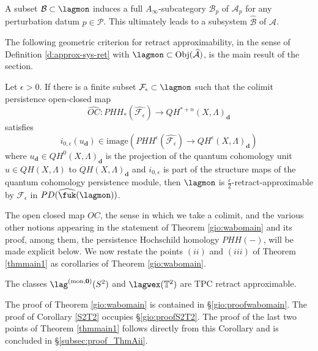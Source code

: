 A subset $\mathcal{B}\subset \lagmon$ induces a full $A_\infty$-subcategory $\mathcal{B}_p$ of $\mathcal{A}_p$ for any perturbation datum $p\in \mathcal{P}$. This  ultimately leads to a subsystem $\widehat{\mathcal{B}}$ of $\widehat{\mathcal{A}}$. %

The following geometric criterion for retract approximability,
in the sense of Definition \ref{d:approx-sys-ret} with $\lagmon \subset \text{Obj}(\widehat{\mathcal{A}})$, is the main result 
of the section.

\begin{thm}\label{gio:wabomain}
	Let $\epsilon>0$. If there is a finite subset $\mathcal{F}_\epsilon\subset\lagmon$ such that the colimit persistence open-closed map $$\widehat{OC}\colon PHH_*(\widehat{\mathcal{F}_\epsilon})\to QH^{*+n}(X,\Lambda)_{\mathbf{d}}$$ satisfies $$i_{0,\epsilon}(u_{\mathbf{d}})\in \text{image}\left(PHH^\epsilon(\widehat{\mathcal{F}_\epsilon})\to QH^\epsilon(X,\Lambda)_{\mathbf{d}}\right)$$ where $u_\mathbf{d}\in QH^0(X,\Lambda)_\mathbf{d}$ is the projection of the quantum cohomology unit  $u\in QH(X,\Lambda)$ to $QH(X,\Lambda)_\mathbf{d}$ and $i_{0,\epsilon}$ is part of the structure maps of the quantum cohomology persistence module, then $\lagmon$ is $\frac{\epsilon}{2}$-retract-approximable by $\mathcal{F}_\epsilon$ in $PD(\widehat{\fuk}(\lagmon))$.
\end{thm}
\noindent The open closed map $OC$, the sense in which we take a colimit, and the various other notions appearing in the statement of Theorem \ref{gio:wabomain} and its proof, among them, the persistence Hochschild homology $PHH( - )$, will be made explicit below.
We now restate the points $(ii)$ and $(iii)$ of Theorem \ref{thmmain1} as corollaries of Theorem \ref{gio:wabomain}.
\begin{cor}\label{S2T2}
The classes $\lag^{\text{(mon,} \mathbf{0} \text{)}}(S^2)$ and $\lagwex(\mathbb{T}^2)$ are TPC retract approximable.
\end{cor}
\noindent The proof of Theorem \ref{gio:wabomain} is contained in \S\ref{gio:proofwabomain}. The proof of Corollary \ref{S2T2} occupies \S\ref{gio:proofS2T2}. The proof of the last two points of Theorem \ref{thmmain1} follows directly from this Corollary and is concluded in \S\ref{subsec:proof_ThmAii}.

